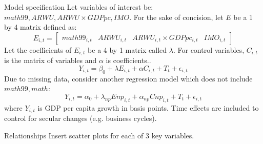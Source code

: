 \documentclass[10pt]{beamer}
\begin{document}
\begin{frame}{Model specification}
    Let variables of interest be: $math99, ARWU, ARWU \times GDPpc, IMO$.
    For the sake of concision, let $E$ be a 1 by 4 matrix defined as:
    \[E_{i,t} = 
    \begin{bmatrix}
        math99_{i, t} & ARWU_{i, t} & ARWU_{i, t} \times GDPpc_{i, t} & IMO_{i, t}
    \end{bmatrix}
    \]
    Let the coefficients of $E_{i, t}$ be a 4 by 1 matrix called $\lambda$. For control variables, $C_{i, t}$ is the matrix of variables and $\alpha$ is coefficients..
    \begin{equation}
        Y_{i, t} = \beta_0 + \lambda E_{i, t} + \alpha C_{i, t} + T_t + \epsilon_{i, t}
    \end{equation}
    Due to missing data, consider another regression model which does not include $math99, math$:
    \begin{equation}
        Y_{i, t} = \alpha_0 + \lambda_{np} Enp_{i, t} + \alpha_{np} Cnp_{i, t} + T_t + \epsilon_{i, t}
    \end{equation}
    where $Y_{i,t}$ is GDP per capita growth in basis points. Time effects are included to control for secular changes (e.g. business cycles).
\end{frame}

\begin{frame}{Relationships}
    Insert scatter plots for each of 3 key variables.
\end{frame}
\end{document}
